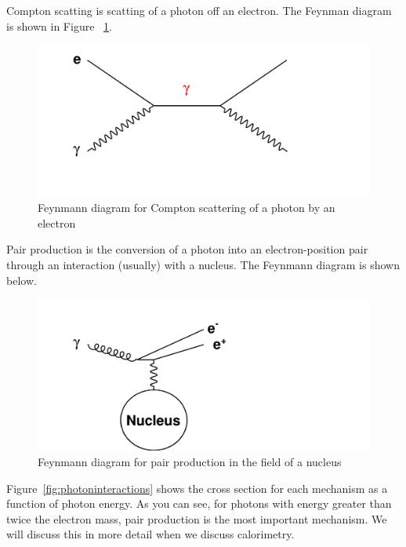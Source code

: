 Compton scatting is scatting of a photon off an electron.  The Feynman diagram is shown in Figure ~\ref{fig:compton}. 


\begin{figure}[h]
\centering\includegraphics[scale=0.5]{./particleinteractions/Pictures/compton.pdf}
\caption{Feynmann diagram for Compton scattering of a photon by an electron}
\label{fig:compton}
\end{figure}

Pair production is the conversion of a photon into an electron-position pair through an interaction (usually) with a nucleus.  The Feynmann diagram is shown below.


\begin{figure}[h]
\centering\includegraphics[scale=0.5]{./particleinteractions/Pictures/pairproduction.pdf}
\caption{Feynmann diagram for pair production in the field of a nucleus}
\label{fig:pairproduction}
\end{figure}



Figure~\ref{fig:photoninteractions} shows the cross section for each mechanism as a 
function of photon energy.  As you can see, for photons with energy greater than twice the 
electron mass, pair production is the most important mechanism.  We will discuss this in more detail when we discuss calorimetry.


